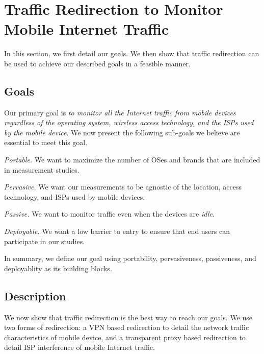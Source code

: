 \section{Traffic Redirection to Monitor Mobile Internet Traffic} 
\label{sec:platform} 

In this section, we first detail our goals. 
We then show that traffic redirection can be used to achieve our described goals in a feasible manner. 

\subsection{Goals}  
\label{sec:goals} 
Our primary goal is \emph{to monitor all the Internet traffic from mobile devices regardless of the operating system, wireless access technology, and the ISPs used by the mobile device}. 
We now present the following sub-goals we believe are essential to meet this goal.
\begin{packedenumerate}
\item \emph{Portable.} We want to maximize the number of OSes and brands that are included in measurement studies.  
\item \emph{Pervasive.} We want our measurements to be agnostic of the location, access technology, and ISPs used by mobile devices. 
\item \emph{Passive.} We want to monitor traffic even when the devices are \emph{idle}.
\item \emph{Deployable.} We want a low barrier to entry to ensure that end users can participate in our studies.
\end{packedenumerate}    
In summary, we define our goal using portability, pervasiveness, passiveness, and deployablity as its building blocks. 

\subsection{Description}
\label{sec:description}

We now show that traffic redirection is the best way to reach our goals. 
We use two forms of redirection: a VPN based redirection to detail the network traffic characteristics of mobile device, and a transparent proxy based redirection to detail ISP interference of mobile Internet traffic. 

